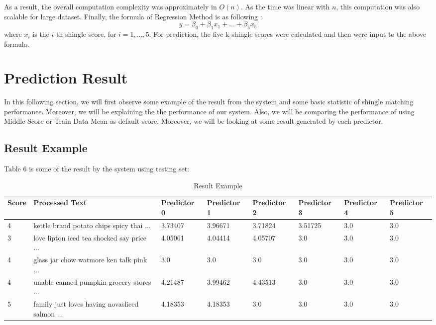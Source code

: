 As a result, the overall computation complexity was approximately in \(O(n)\).
As the time was linear with \(n\), this computation was also scalable for large dataset. Finally, the formula of Regression Method is as following : 
\begin{displaymath}
y = \beta_0  + \beta_1 x_1 + \dots + \beta_5 x_5
\end{displaymath}
where $x_i$ is the $i$-th shingle score, for $i=1,...,5$. For prediction, the five k-shingle scores were calculated and then were input to the above formula.

\section{Prediction Result}
In this following section, we will first observe some example of the result from the system and some basic statistic of shingle matching performance. Moreover, we will be explaining the the performance of our system. Also, we will be comparing the performance of using Middle Score or Train Data Mean as default score. Moreover, we will be looking at some result generated by each predictor.


\subsection{Result Example}
Table 6 is some of the result by the system using testing set:

\begin{table*}
	\caption{Result Example}
	\label{tab:commands}
	\begin{tabular}{llllllll}
	\toprule
	Score &	Processed Text & Predictor 0 & Predictor 1 & Predictor 2 &	Predictor 3 & Predictor 4 & Predictor 5 \\
	\midrule
	4	& kettle brand potato chips spicy thai ...& 3.73407	 &3.96671	&3.71824	 & 3.51725&3.0 & 3.0\\
	3&love lipton iced tea shocked say price ... &	4.05061 	& 4.04414	&4.05707&	3.0&	3.0	&3.0\\
	4&glass jar chow watmore ken talk pink ...&	3.0 &	3.0	&3.0	&3.0	&3.0	 &3.0\\
	4 &unable canned pumpkin grocery stores ...	& 4.21487 &	3.99462	& 4.43513	 & 3.0	& 3.0	&3.0\\
	5&family just loves having novasliced salmon ...&	4.18353	&4.18353	&3.0	&3.0	&3.0	&3.0\\

	\bottomrule
\end{tabular}
\end{table*}

